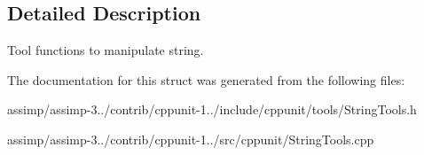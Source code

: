\subsection{Detailed Description}
Tool functions to manipulate string. 

The documentation for this struct was generated from the following files\+:\begin{DoxyCompactItemize}
\item 
assimp/assimp-\/3../contrib/cppunit-\/1../include/cppunit/tools/String\+Tools.\+h\item 
assimp/assimp-\/3../contrib/cppunit-\/1../src/cppunit/String\+Tools.\+cpp\end{DoxyCompactItemize}
